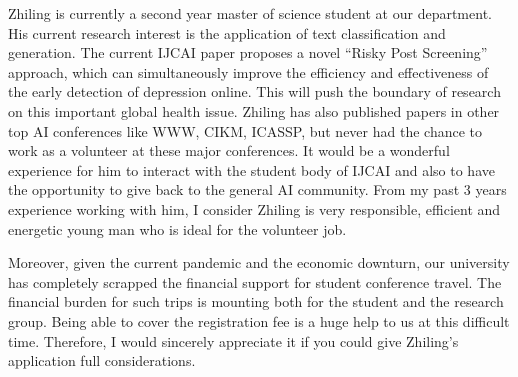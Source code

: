 \documentclass[11pt]{article}
\begin{document}
Zhiling is currently a second year master of science student at our department. His current research interest is
the application of text classification and generation. 
The current IJCAI paper proposes a novel ``Risky Post Screening'' approach, which can simultaneously improve 
the efficiency and effectiveness of the early detection of depression online. This will push the boundary of 
research on this important global health issue. Zhiling has also published papers in other top AI conferences like WWW, CIKM, 
ICASSP, but never had the chance to work as a volunteer at these major conferences. It would be a wonderful experience for
him to interact with the student body of IJCAI and also to have the opportunity to give back to the general AI community.
From my past 3 years experience working with him, I consider Zhiling is very responsible, efficient and energetic young man
who is ideal for the volunteer job. 

Moreover, given the current pandemic and the economic downturn, our university has completely scrapped 
the financial support for student conference travel. The financial burden for such trips is mounting both for the student
and the research group. Being able to cover the registration fee is a huge help to us at this difficult time. 
Therefore, I would sincerely appreciate it if you could give Zhiling's application full considerations. 
\end{document}
